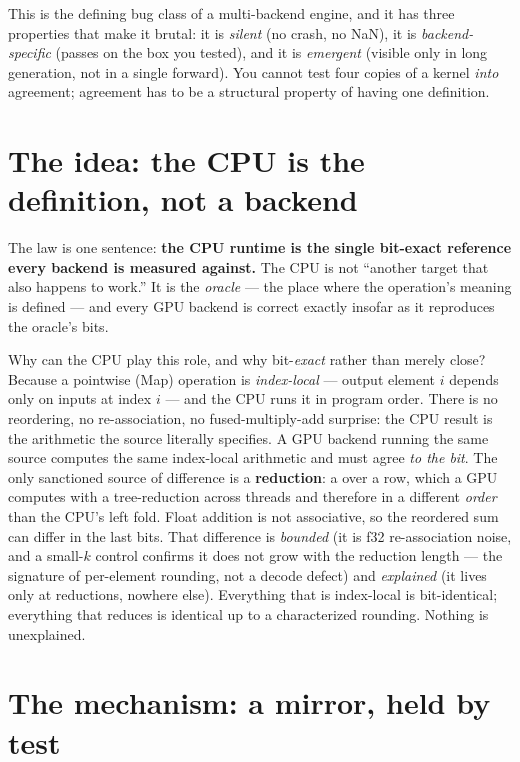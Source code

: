 \documentclass[11pt]{article}
\begin{document}
This is the defining bug class of a multi-backend engine, and it has three properties that make it
brutal: it is \emph{silent} (no crash, no NaN), it is \emph{backend-specific} (passes on the box you
tested), and it is \emph{emergent} (visible only in long generation, not in a single forward). You cannot
test four copies of a kernel \emph{into} agreement; agreement has to be a structural property of having
one definition.

\section{The idea: the CPU is the definition, not a backend}
\label{sec:idea}

The law is one sentence: \textbf{the CPU runtime is the single bit-exact reference every backend is
measured against.} The CPU is not ``another target that also happens to work.'' It is the \emph{oracle} ---
the place where the operation's meaning is defined --- and every GPU backend is correct exactly insofar as
it reproduces the oracle's bits.

Why can the CPU play this role, and why bit-\emph{exact} rather than merely close? Because a pointwise
(Map) operation is \emph{index-local} --- output element $i$ depends only on inputs at index $i$ --- and
the CPU runs it in program order. There is no reordering, no re-association, no fused-multiply-add
surprise: the CPU result is the arithmetic the source literally specifies. A GPU backend running the same
source computes the same index-local arithmetic and must agree \emph{to the bit}. The only sanctioned
source of difference is a \textbf{reduction}: a  over a row, which a GPU computes with a
tree-reduction across threads and therefore in a different \emph{order} than the CPU's left fold. Float
addition is not associative, so the reordered sum can differ in the last bits. That difference is
\emph{bounded} (it is f32 re-association noise, and a small-$k$ control confirms it does not grow with the
reduction length --- the signature of per-element rounding, not a decode defect) and \emph{explained}
(it lives only at reductions, nowhere else). Everything that is index-local is bit-identical; everything
that reduces is identical up to a characterized rounding. Nothing is unexplained.

\section{The mechanism: a mirror, held by test}
\label{sec:mech}
\end{document}
